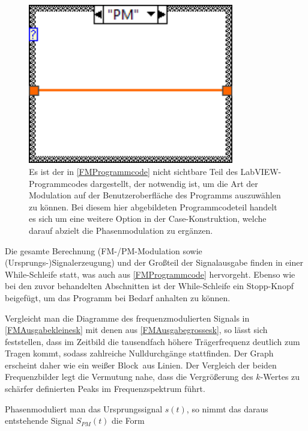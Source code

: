 \documentclass[
a4paper,
12pt,
pagesize,
ngerman
]{scrartcl}
\begin{document}
	\begin{figure}[H]
		\centering
		\includegraphics[width=0.8\textwidth]{EIRE2018Dateien/Tag4/FMPM-Erzeugung/PM-FMPM-Erzeugungd1} %
		\caption{Es ist der in \cref{FMProgrammcode} nicht sichtbare Teil des LabVIEW-Programmcodes dargestellt, der notwendig ist, um die Art der Modulation auf der Benutzeroberfläche des Programms auszuwählen zu können. Bei diesem hier abgebildeten Programmcodeteil handelt es sich um eine weitere Option in der Case-Konstruktion, welche darauf abzielt die Phasenmodulation zu ergänzen.}
		\label{PMProgrammcode}
	\end{figure}
	
	\noindent Die gesamte Berechnung (FM-/PM-Modulation sowie (Ursprungs-)Signalerzeugung) und der Großteil der Signalausgabe finden in einer While-Schleife statt, was auch aus \cref{FMProgrammcode} hervorgeht. 
	Ebenso wie bei den zuvor behandelten Abschnitten ist der While-Schleife ein \glqq Stopp\grqq -Knopf beigefügt, um das Programm bei Bedarf anhalten zu können.

	Vergleicht man die Diagramme des frequenzmodulierten Signals in \cref{FMAusgabekleinesk} mit denen aus \cref{FMAusgabegrossesk}, so lässt sich feststellen, dass im Zeitbild die tausendfach höhere Trägerfrequenz deutlich zum Tragen kommt, sodass zahlreiche Nulldurchgänge stattfinden. 
	Der Graph erscheint daher wie ein \glqq weißer Block\grqq\ aus Linien. 
	Der Vergleich der beiden Frequenzbilder legt die Vermutung nahe, dass die Vergrößerung des $k$-Wertes zu schärfer definierten Peaks im Frequenzspektrum führt.
	
	Phasenmoduliert man das Ursprungssignal $s(t)$, so nimmt das daraus entstehende Signal $S_{PM}(t)$ die Form
	
\end{document}
